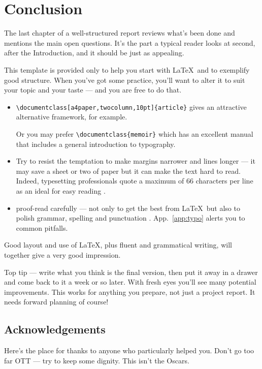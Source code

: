 \chapter{Conclusion}\label{andfinally}
The last chapter of a well-structured report reviews what's been done and
mentions the main open questions.  It's the part a typical reader looks
at second, after the Introduction, and it should be just as appealing.
\par
This template is provided only to help you start with \LaTeX\ and to
exemplify good structure. When you've got some practice, you'll want to
alter it to suit your topic and your taste --- and you are free to do
that.
\begin{itemize}
    \item\verb+\documentclass[a4paper,twocolumn,10pt]{article}+
    gives an attractive alternative framework, for example.\par Or you
may prefer \verb+\documentclass{memoir}+ which has an excellent
manual \cite{MEM} that includes a general introduction to typography.
    \item Try to resist the temptation to make margins narrower
    and lines longer --- it may save a sheet or two of paper but it
    can make the text hard to read. Indeed, typesetting professionals 
    quote a maximum of 66 characters per line as an ideal for easy reading
          \cite[Sec.~5.2.2]{NSS}.
    \item proof-read carefully --- not only to get the best from \LaTeX\
but also to polish grammar, spelling and punctuation \cite{ESL}.
App.~\ref{app:typo} alerts you to common pitfalls.
\end{itemize}
Good layout and use of \LaTeX, plus fluent and grammatical writing, will
together give a very good impression.
\par
Top tip --- write what you think is the final version, then put it
away in a drawer and come back to it a week or so later. With fresh
eyes you'll see many potential improvements. This works for anything you
prepare, not just a project report. It needs forward planning of
course!
\section*{Acknowledgements}
Here's the place for thanks to anyone who particularly helped you.
Don't go too far OTT --- try to keep some dignity. This isn't the 
Oscars.

